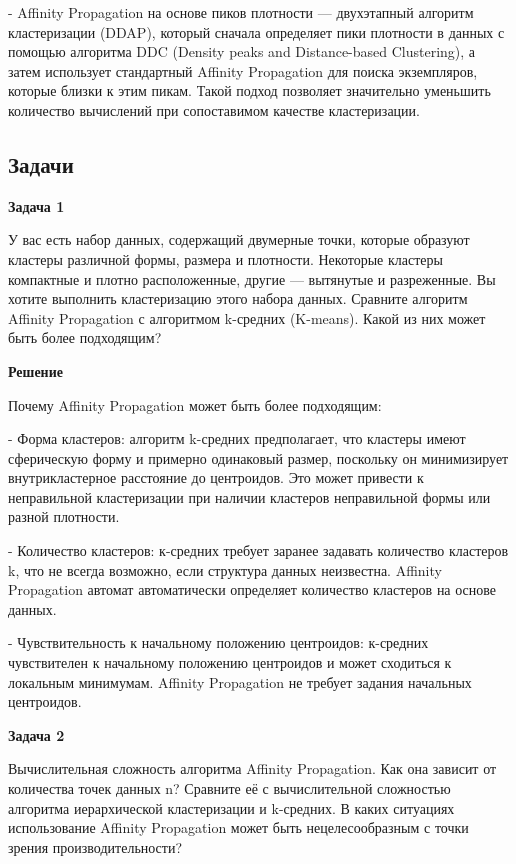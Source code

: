 - Affinity Propagation на основе пиков плотности — двухэтапный алгоритм кластеризации (DDAP), который сначала определяет пики плотности в данных с помощью алгоритма DDC (Density peaks and Distance-based Clustering), а затем использует стандартный Affinity Propagation для поиска экземпляров, которые близки к этим пикам. Такой подход позволяет значительно уменьшить количество вычислений при сопоставимом качестве кластеризации.

\subsection{Задачи}

\textbf{Задача 1}

У вас есть набор данных, содержащий двумерные точки, которые образуют кластеры различной формы, размера и плотности. Некоторые кластеры компактные и плотно расположенные, другие — вытянутые и разреженные. Вы хотите выполнить кластеризацию этого набора данных. Сравните алгоритм Affinity Propagation с алгоритмом k-средних (K-means). Какой из них может быть более подходящим?


\textbf{Решение}

Почему Affinity Propagation может быть более подходящим:

- Форма кластеров: алгоритм k-средних предполагает, что кластеры имеют сферическую форму и примерно одинаковый размер, поскольку он минимизирует внутрикластерное расстояние до центроидов. Это может привести к неправильной кластеризации при наличии кластеров неправильной формы или разной плотности.

- Количество кластеров: к-средних требует заранее задавать количество кластеров k, что не всегда возможно, если структура данных неизвестна. Affinity Propagation автомат {автоматически} определяет количество кластеров на основе данных.

- Чувствительность к начальному положению центроидов: к-средних чувствителен к начальному положению центроидов и может сходиться к локальным минимумам. Affinity Propagation не требует задания начальных центроидов.


\textbf{Задача 2}

Вычислительная сложность алгоритма Affinity Propagation. Как она зависит от количества точек данных n? Сравните её с вычислительной сложностью алгоритма иерархической кластеризации и k-средних. В каких ситуациях использование Affinity Propagation может быть нецелесообразным с точки зрения производительности?

